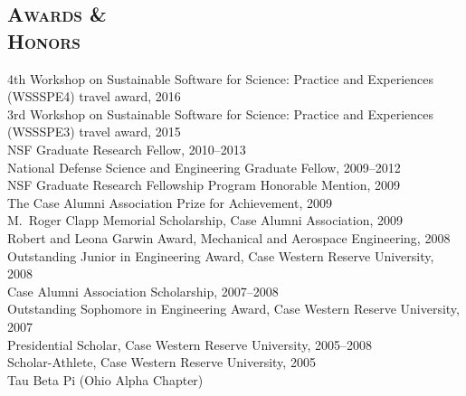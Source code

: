 \documentclass[margin,line,11pt]{res}
\begin{document}
\begin{resume}
\section{\textsc{Awards \& \\Honors}}
4th Workshop on Sustainable Software for Science: Practice and Experiences (WSSSPE4) travel award, 2016 \\
3rd Workshop on Sustainable Software for Science: Practice and Experiences (WSSSPE3) travel award, 2015 \\
NSF Graduate Research Fellow, 2010--2013 \\
National Defense Science and Engineering Graduate Fellow, 2009--2012 \\
NSF Graduate Research Fellowship Program Honorable Mention, 2009 \\
The Case Alumni Association Prize for Achievement, 2009 \\
M.\ Roger Clapp Memorial Scholarship, Case Alumni Association, 2009 \\
Robert and Leona Garwin Award, Mechanical and Aerospace Engineering, 2008 \\
Outstanding Junior in Engineering Award, Case Western Reserve University, 2008 \\
Case Alumni Association Scholarship, 2007--2008 \\
Outstanding Sophomore in Engineering Award, Case Western Reserve University, 2007 \\
Presidential Scholar, Case Western Reserve University, 2005--2008 \\
Scholar-Athlete, Case Western Reserve University, 2005 \\
Tau Beta Pi (Ohio Alpha Chapter)

%


\end{resume}
\end{document}
